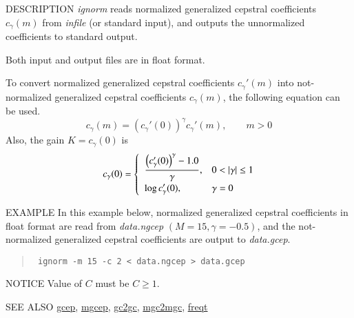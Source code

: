 \begin{qsection}{DESCRIPTION}
{\em ignorm} reads normalized generalized cepstral coefficients
$c_\gamma(m)$ from {\em infile} (or standard input), 
and outputs the unnormalized coefficients to standard output.

Both input and output files are in float format.

To convert normalized generalized cepstral coefficients
$c_\gamma'(m)$ into not-normalized generalized cepstral coefficients
$c_\gamma(m)$, the following equation can be used.
\begin{displaymath}
c_\gamma(m) = \left( c_\gamma'(0) \right)^{\gamma} c_\gamma'(m), \qquad m>0
\end{displaymath}
Also, the gain $K = c_\gamma(0)$ is
\begin{displaymath}
c_\gamma(0) = \begin{cases} \;\; \displaystyle
          \frac{\Bigl(c_\gamma'(0)\Bigr)^{\gamma} - 1.0}{\gamma},
                & 0<|\gamma|\leq 1 \\ \;\; \displaystyle
          \log c_\gamma'(0),  & \gamma=0
        \end{cases}
\end{displaymath}
\end{qsection}

\begin{options}
\end{options}

\begin{qsection}{EXAMPLE}
In this example below,
normalized generalized cepstral coefficients in
float format are read from {\em data.ngcep} $(M=15, \gamma=-0.5)$,
and the not-normalized generalized cepstral coefficients
are output to {\em data.gcep}.
\begin{quote}
 \verb! ignorm -m 15 -c 2 < data.ngcep > data.gcep!
\end{quote} 
\end{qsection}

\begin{qsection}{NOTICE}
Value of $C$ must be $ C \geq 1$.
\end{qsection}

\begin{qsection}{SEE ALSO}
\hyperlink{gcep}{gcep},
\hyperlink{mgcep}{mgcep},
\hyperlink{gc2gc}{gc2gc},
\hyperlink{mgc2mgc}{mgc2mgc},
\hyperlink{freqt}{freqt}
\end{qsection}
